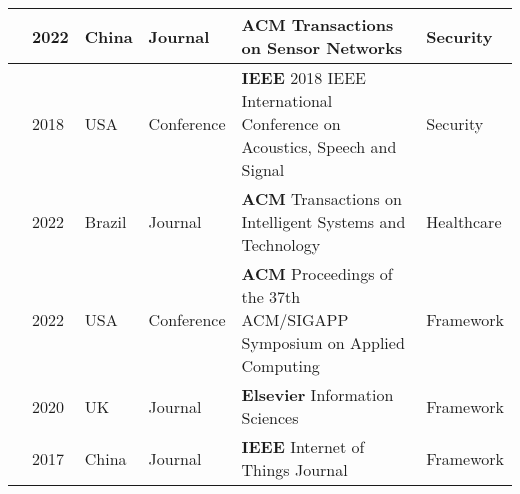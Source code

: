 \begin{footnotesize}
\begin{longtable}{p{1.2cm} p{1cm} p{1.6cm} p{3.2cm} p{5cm} p{3cm}}
        \cite{SunSecure} & 2022 & China & Journal & \textbf{ACM} Transactions on Sensor Networks & Security \\
        \hline
        \cite{xiong2018defending} & 2018 & USA & Conference & \textbf{IEEE} 2018 IEEE International Conference on Acoustics, Speech and Signal & Security \\
        \hline
        \cite{AntunesFederated} & 2022 & Brazil & Journal & \textbf{ACM} Transactions on Intelligent Systems and Technology & Healthcare \\
        \hline
        \cite{opara2022framework} & 2022 & USA & Conference & \textbf{ACM} Proceedings of the 37th ACM/SIGAPP Symposium on Applied Computing & Framework \\
        \hline
        \cite{perera2020designing} & 2020 & UK & Journal & \textbf{Elsevier} Information Sciences & Framework \\
        \hline
        \cite{zhang2017privacy} & 2017 & China & Journal & \textbf{IEEE} Internet of Things Journal & Framework \\
        \hline

\end{longtable}
\end{footnotesize}
